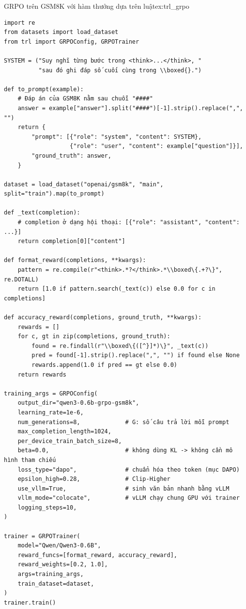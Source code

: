 \begin{example}{GRPO trên GSM8K với hàm thưởng dựa trên luật}{ex:trl_grpo}
\begin{verbatim}
import re
from datasets import load_dataset
from trl import GRPOConfig, GRPOTrainer

SYSTEM = ("Suy nghĩ từng bước trong <think>...</think>, "
          "sau đó ghi đáp số cuối cùng trong \\boxed{}.")

def to_prompt(example):
    # Đáp án của GSM8K nằm sau chuỗi "####"
    answer = example["answer"].split("####")[-1].strip().replace(",", "")
    return {
        "prompt": [{"role": "system", "content": SYSTEM},
                   {"role": "user", "content": example["question"]}],
        "ground_truth": answer,
    }

dataset = load_dataset("openai/gsm8k", "main", split="train").map(to_prompt)

def _text(completion):
    # completion ở dạng hội thoại: [{"role": "assistant", "content": ...}]
    return completion[0]["content"]

def format_reward(completions, **kwargs):
    pattern = re.compile(r"<think>.*?</think>.*\\boxed\{.+?\}", re.DOTALL)
    return [1.0 if pattern.search(_text(c)) else 0.0 for c in completions]

def accuracy_reward(completions, ground_truth, **kwargs):
    rewards = []
    for c, gt in zip(completions, ground_truth):
        found = re.findall(r"\\boxed\{([^}]*)\}", _text(c))
        pred = found[-1].strip().replace(",", "") if found else None
        rewards.append(1.0 if pred == gt else 0.0)
    return rewards

training_args = GRPOConfig(
    output_dir="qwen3-0.6b-grpo-gsm8k",
    learning_rate=1e-6,
    num_generations=8,             # G: số câu trả lời mỗi prompt
    max_completion_length=1024,
    per_device_train_batch_size=8,
    beta=0.0,                      # không dùng KL -> không cần mô hình tham chiếu
    loss_type="dapo",              # chuẩn hóa theo token (mục DAPO)
    epsilon_high=0.28,             # Clip-Higher
    use_vllm=True,                 # sinh văn bản nhanh bằng vLLM
    vllm_mode="colocate",          # vLLM chạy chung GPU với trainer
    logging_steps=10,
)

trainer = GRPOTrainer(
    model="Qwen/Qwen3-0.6B",
    reward_funcs=[format_reward, accuracy_reward],
    reward_weights=[0.2, 1.0],
    args=training_args,
    train_dataset=dataset,
)
trainer.train()
\end{verbatim}
\end{example}

